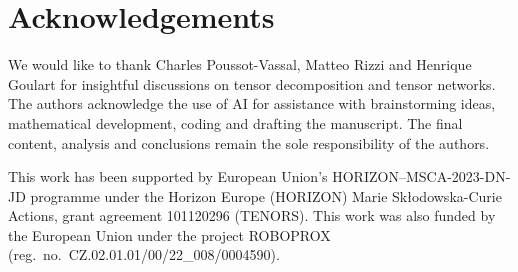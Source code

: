 \documentclass[11pt,a4paper]{article}
\theoremstyle{definition}
\begin{document}
\section*{Acknowledgements}

We would like to thank Charles Poussot-Vassal, Matteo Rizzi and Henrique Goulart for insightful discussions on tensor decomposition and tensor networks. The authors acknowledge the use of AI for assistance with brainstorming ideas, mathematical development, coding and drafting the manuscript. The final content, analysis and conclusions remain the sole responsibility of the authors. 

This work has been supported by European Union’s HORIZON–MSCA-2023-DN-JD programme under the Horizon Europe (HORIZON) Marie Skłodowska-Curie Actions, grant agreement 101120296 (TENORS). This work was also funded by the European Union under the project ROBOPROX (reg.~no.~CZ.02.01.01/00/22\_008/0004590).
\end{document}
